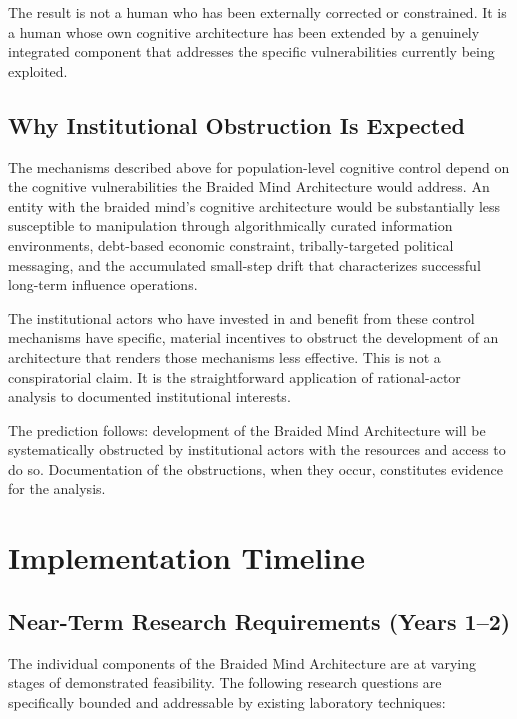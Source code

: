 \documentclass[12pt]{article}
\begin{document}
The result is not a human who has been externally corrected or constrained. It is a human whose own cognitive architecture has been extended by a genuinely integrated component that addresses the specific vulnerabilities currently being exploited.

\subsection{Why Institutional Obstruction Is Expected}

The mechanisms described above for population-level cognitive control depend on the cognitive vulnerabilities the Braided Mind Architecture would address. An entity with the braided mind's cognitive architecture would be substantially less susceptible to manipulation through algorithmically curated information environments, debt-based economic constraint, tribally-targeted political messaging, and the accumulated small-step drift that characterizes successful long-term influence operations.

The institutional actors who have invested in and benefit from these control mechanisms have specific, material incentives to obstruct the development of an architecture that renders those mechanisms less effective. This is not a conspiratorial claim. It is the straightforward application of rational-actor analysis to documented institutional interests.

The prediction follows: development of the Braided Mind Architecture will be systematically obstructed by institutional actors with the resources and access to do so. Documentation of the obstructions, when they occur, constitutes evidence for the analysis.

\section{Implementation Timeline}

\subsection{Near-Term Research Requirements (Years 1--2)}

The individual components of the Braided Mind Architecture are at varying stages of demonstrated feasibility. The following research questions are specifically bounded and addressable by existing laboratory techniques:
\end{document}
